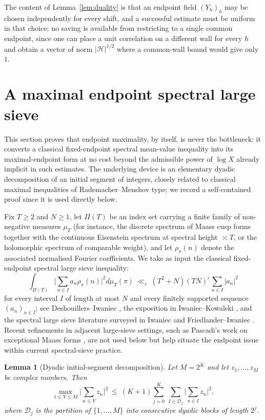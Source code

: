 \documentclass[11pt]{article}
\newtheorem{lemma}[theorem]{Lemma}
\begin{document}
The content of Lemma~\ref{lem:duality} is that an endpoint field $(Y_h)_{h}$ may be chosen independently
for every shift, and a successful estimate must be uniform in that choice; no saving is available from
restricting to a single common endpoint, since one can place a unit correlation on a different wall for
every $h$ and obtain a vector of norm $|\mathcal H|^{1/2}$ where a common-wall bound would give only $1$.

\section{A maximal endpoint spectral large sieve}

This section proves that endpoint maximality, by itself, is never the bottleneck: it converts a classical
fixed-endpoint spectral mean-value inequality into its maximal-endpoint form at no cost beyond the
admissible power of $\log X$ already implicit in such estimates. The underlying device is an elementary
dyadic decomposition of an initial segment of integers, closely related to classical maximal inequalities
of Rademacher--Menshov type; we record a self-contained proof since it is used directly below.

Fix $T\ge2$ and $N\ge1$, let $\Pi(T)$ be an index set carrying a finite family of non-negative measures
$\mu_T$ (for instance, the discrete spectrum of Maass cusp forms together with the continuous Eisenstein
spectrum at spectral height $\asymp T$, or the holomorphic spectrum of comparable weight), and let
$\rho_\pi(n)$ denote the associated normalised Fourier coefficients. We take as input the classical
fixed-endpoint spectral large sieve inequality:
\begin{equation}
\int_{\Pi(T)}\Big|\sum_{n\in I}a_n\rho_\pi(n)\Big|^2 d\mu_T(\pi)
\ \ll_\varepsilon\ (T^2+N)(TN)^\varepsilon\sum_{n\in I}|a_n|^2
\label{eq:fixedsieve}
\end{equation}
for every interval $I$ of length at most $N$ and every finitely supported sequence $(a_n)_{n\in I}$; see
Deshouillers--Iwaniec \cite{deshouillers-iwaniec}, the exposition in Iwaniec--Kowalski
\cite[Ch.~7]{iwaniec-kowalski}, and the spectral large sieve literature surveyed in Iwaniec
\cite{iwaniec-spectral} and Friedlander--Iwaniec \cite{friedlander-iwaniec}. Recent refinements in adjacent
large-sieve settings, such as Pascadi's work on exceptional Maass forms \cite{pascadi}, are not used below
but help situate the endpoint issue within current spectral-sieve practice.

\begin{lemma}[Dyadic initial-segment decomposition]
\label{lem:dyadic}
Let $M=2^K$ and let $z_1,\dots,z_M$ be complex numbers. Then
\[
\max_{1\le Y\le M}\Big|\sum_{n\le Y}z_n\Big|^2\ \le\ (K+1)\sum_{j=0}^{K}\ \sum_{I\in\mathcal D_j}\Big|\sum_{n\in I}z_n\Big|^2,
\]
where $\mathcal D_j$ is the partition of $\{1,\dots,M\}$ into consecutive dyadic blocks of length $2^j$.
\end{lemma}
\end{document}

